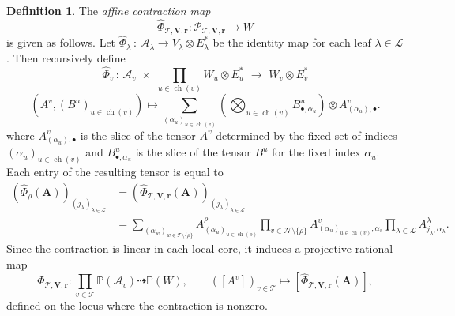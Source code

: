 \documentclass[12pt]{article}
\theoremstyle{definition}
\newtheorem{definition}[theorem]{Definition}
\numberwithin{theorem}{section}
\newcommand{\PP}{\mathbb{P}}
\begin{document}
\begin{definition}
    The \emph{affine contraction map}
\begin{equation*}
        \widehat{\Phi}_{\mathscr T,\mathbf V,\mathbf r}:
    \mathcal P_{\mathscr T,\mathbf V,\mathbf r}
    \longrightarrow W 
\end{equation*}
is given as follows. 
Let $\widehat{\Phi}_\lambda \, : \, \mathcal{A}_\lambda \longrightarrow  V_\lambda \otimes E_\lambda^*$ 
be the identity map for each leaf $\lambda \in \mathscr{L}$. Then recursively define
\begin{equation} \label{eq:TTN_map_at_v}
\widehat{\Phi}_v \, : \,  \mathcal{A}_v \, \, \times  \,\, \prod_{u \in \operatorname{ch}(v)} W_u \otimes E_u^* \,\,  \longrightarrow \,\, W_v \otimes E_v^* 
\end{equation}
\begin{equation}\label{eq:Phi_v_formula}
\left(A^v,(B^u)_{u\in\operatorname{ch}(v)}\right)
\longmapsto
\sum_{(\alpha_u)_{u \in \operatorname{ch}(v)}}
\left(
\bigotimes_{u\in\operatorname{ch}(v)}
B^u_{\bullet,\alpha_u}
\right)
\otimes
A^v_{(\alpha_u),\bullet}.
\end{equation}
where $A^v_{(\alpha_u),\bullet}$ is the slice of the tensor $A^v$ determined by the fixed set of indices  $(\alpha_u)_{u \in \operatorname{ch}(v)}$ and $B^u_{\bullet, \alpha_u}$ is the slice of the tensor $B^u$ for the fixed index $\alpha_u$. 
Each entry of the resulting tensor is equal to 
\begin{align} \label{eq:TTN_param}
\left(\widehat{\Phi}_\rho(\mathbf{A})\right)_{(j_\lambda)_{\lambda\in\mathscr L}} &= \left(
    \widehat{\Phi}_{\mathscr T,\mathbf V,\mathbf r}
    (\mathbf A)
    \right)_{(j_\lambda)_{\lambda\in\mathscr L}} \nonumber\\
    &=
    \sum_{(\alpha_w)_{w\in\mathscr T\setminus\{\rho\}}}
    A^\rho_{(\alpha_u)_{u\in\operatorname{ch}(\rho)}}
    \prod_{v\in\mathscr N\setminus\{\rho\}}
    A^v_{(\alpha_u)_{u\in\operatorname{ch}(v)},\alpha_v}
    \prod_{\lambda\in\mathscr L}
    A^\lambda_{j_\lambda,\alpha_\lambda}.
\end{align}
Since the contraction is linear in each local core, it induces a projective
rational map
\begin{equation*}
    \Phi_{\mathscr T,\mathbf V,\mathbf r}:
    \prod_{v\in\mathscr T}\PP(\mathcal A_v)
    \dashrightarrow
    \PP(W),
    \qquad
    ([A^v])_{v\in\mathscr T}
    \longmapsto
    [\widehat{\Phi}_{\mathscr T,\mathbf V,\mathbf r}
    (\mathbf A)],
\end{equation*}
defined on the locus where the contraction is nonzero.
\end{definition}
\end{document}
